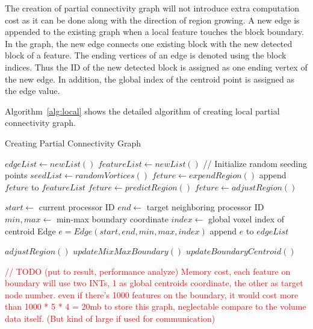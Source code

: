 \documentclass[10pt, conference, compsocconf]{IEEEtran}
\begin{document}
The creation of partial connectivity graph will not introduce extra computation cost as it can be done along with the direction of region growing. A new edge is appended to the existing graph when a local feature touches the block boundary.
In the graph, the new edge connects one existing block with the new detected block of a feature. The ending vertices of an edge is denoted using the block indices. Thus the ID of the new detected block is assigned as one ending vertex of the new edge. In addition, the global index of the centroid point is assigned as the edge value. 

Algorithm~\ref{alg:local} shows the detailed algorithm of creating local partial connectivity graph.
\begin{algorithm}
\caption{Creating Partial Connectivity Graph}
\label{alg:local}
\begin{algorithmic}[1]
\STATE $edgeList \leftarrow new List()$
\STATE $featureList \leftarrow new List()$
	\STATE // Initialize random seeding points
	\STATE $seedList \leftarrow randomVortices()$
		\STATE $feture \leftarrow expendRegion()$
		\STATE append $feture$ to $featureList$
	\ENDFOR	
\ELSE
		\STATE $feture \leftarrow predictRegion()$
		\STATE $feture \leftarrow adjustRegion()$	
		
		\STATE $start \leftarrow$ current processor ID
		\STATE $end \leftarrow$ target neighboring processor ID
		\STATE $min,max \leftarrow$ min-max boundary coordinate
		\STATE $index \leftarrow$ global voxel index of centroid
		\STATE Edge $e = Edge(start, end, min, max, index)$
		\STATE append $e$ to $edgeList$
	\ENDFOR
\ENDIF
\end{algorithmic}
\begin{algorithmic} \STATE \end{algorithmic}	%
\begin{algorithmic}[1]
\STATE $adjustRegion()$
		\STATE $updateMixMaxBoundary()$
		\STATE $updateBoundaryCentroid()$
	\ENDIF
\end{algorithmic}
\end{algorithm}

\textcolor{red}{
// TODO (put to result, performance analyze)
Memory cost, each feature on boundary will use two INTs, 1 as global centroids coordinate, the other as target node number. even if there's 1000 features on the boundary, it would cost more than 1000 * 5 * 4 = 20mb to store this graph, neglectable compare to the volume data itself. (But kind of large if used for communication)
}
\end{document}
